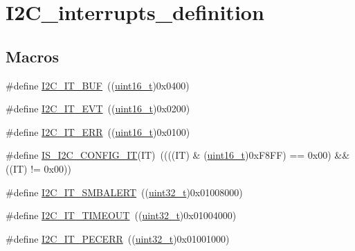 \hypertarget{group___i2_c__interrupts__definition}{}\section{I2\+C\+\_\+interrupts\+\_\+definition}
\label{group___i2_c__interrupts__definition}
\subsection*{Macros}
\begin{DoxyCompactItemize}
\item 
\#define \hyperlink{group___i2_c__interrupts__definition_gad3ff3f405b882aa4d2f91310aa1cc0df}{I2\+C\+\_\+\+I\+T\+\_\+\+B\+UF}~((\hyperlink{_p_e___types_8h_a1f1825b69244eb3ad2c7165ddc99c956}{uint16\+\_\+t})0x0400)
\item 
\#define \hyperlink{group___i2_c__interrupts__definition_gadd59efa313e1598a084a1e5ec3905b02}{I2\+C\+\_\+\+I\+T\+\_\+\+E\+VT}~((\hyperlink{_p_e___types_8h_a1f1825b69244eb3ad2c7165ddc99c956}{uint16\+\_\+t})0x0200)
\item 
\#define \hyperlink{group___i2_c__interrupts__definition_gadba3667b439cbf4ba1e6e9aec961ab03}{I2\+C\+\_\+\+I\+T\+\_\+\+E\+RR}~((\hyperlink{_p_e___types_8h_a1f1825b69244eb3ad2c7165ddc99c956}{uint16\+\_\+t})0x0100)
\item 
\#define \hyperlink{group___i2_c__interrupts__definition_gae2695a081871336881f9105d6c847c4f}{I\+S\+\_\+\+I2\+C\+\_\+\+C\+O\+N\+F\+I\+G\+\_\+\+IT}(IT)~((((IT) \& (\hyperlink{_p_e___types_8h_a1f1825b69244eb3ad2c7165ddc99c956}{uint16\+\_\+t})0x\+F8\+F\+F) == 0x00) \&\& ((\+I\+T) != 0x00))
\item 
\#define \hyperlink{group___i2_c__interrupts__definition_gab6049d4dd856a085127752e01ebb8120}{I2\+C\+\_\+\+I\+T\+\_\+\+S\+M\+B\+A\+L\+E\+RT}~((\hyperlink{_p_e___types_8h_a33594304e786b158f3fb30289278f5af}{uint32\+\_\+t})0x01008000)
\item 
\#define \hyperlink{group___i2_c__interrupts__definition_ga45ce34b163b456a5fb3833f1264d93b4}{I2\+C\+\_\+\+I\+T\+\_\+\+T\+I\+M\+E\+O\+UT}~((\hyperlink{_p_e___types_8h_a33594304e786b158f3fb30289278f5af}{uint32\+\_\+t})0x01004000)
\item 
\#define \hyperlink{group___i2_c__interrupts__definition_ga23069e7787c4f052f34887c02bc44100}{I2\+C\+\_\+\+I\+T\+\_\+\+P\+E\+C\+E\+RR}~((\hyperlink{_p_e___types_8h_a33594304e786b158f3fb30289278f5af}{uint32\+\_\+t})0x01001000)
\item 

\end{DoxyCompactItemize}
